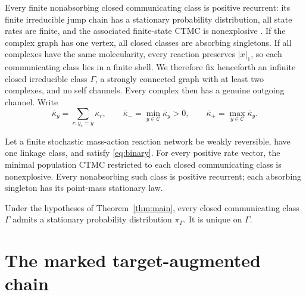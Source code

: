 Every finite nonabsorbing closed communicating class is positive recurrent:
its finite irreducible jump chain has a stationary probability distribution,
all state rates are finite, and the associated finite-state CTMC is
nonexplosive \citep{Norris1997}.  If
the complex graph has one vertex, all closed classes are absorbing
singletons.  If all complexes have the same molecularity, every reaction
preserves \(|x|_1\), so each communicating class lies in a finite shell.  We
therefore fix henceforth an infinite closed irreducible class \(\Gamma\), a
strongly connected graph with at least two complexes, and no self channels.
Every complex then has a genuine outgoing channel.  Write
\begin{equation}\label{eq:kbar}
  \bar\kappa_y=\sum_{r:y_r=y}\kappa_r,
  \qquad
  \bar\kappa_- =\min_{y\in\mathcal C}\bar\kappa_y>0,
  \qquad
  \bar\kappa_+ =\max_{y\in\mathcal C}\bar\kappa_y.
\end{equation}

\begin{theorem}\label{thm:main}
Let a finite stochastic mass-action reaction network be weakly reversible,
have one linkage class, and satisfy \eqref{eq:binary}.  For every positive
rate vector, the minimal population CTMC restricted to each closed
communicating class is nonexplosive.  Every nonabsorbing such class is
positive recurrent; each absorbing singleton has its point-mass stationary
law.
\end{theorem}

\begin{corollary}\label{cor:stationary}
Under the hypotheses of Theorem~\ref{thm:main}, every closed communicating
class \(\Gamma\) admits a stationary probability distribution
\(\pi_\Gamma\).  It is unique on \(\Gamma\).
\end{corollary}

\section{The marked target-augmented chain}\label{sec:marked}

